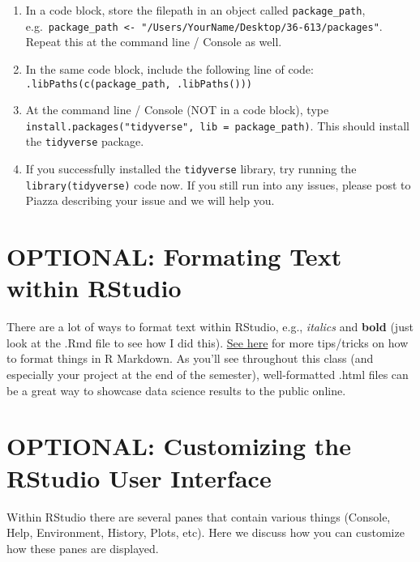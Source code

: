 \documentclass[
]{article}
\begin{document}
\begin{enumerate}
\def\labelenumi{\alph{enumi}.}
\setcounter{enumi}{1}
\item
  In a code block, store the filepath in an object called
  \texttt{package\_path},
  e.g.~\texttt{package\_path\ \textless{}-\ "/Users/YourName/Desktop/36-613/packages"}.
  Repeat this at the command line / Console as well.
\item
  In the same code block, include the following line of code:
  \texttt{.libPaths(c(package\_path,\ .libPaths()))}
\item
  At the command line / Console (NOT in a code block), type
  \texttt{install.packages("tidyverse",\ lib\ =\ package\_path)}. This
  should install the \texttt{tidyverse} package.
\item
  If you successfully installed the \texttt{tidyverse} library, try
  running the \texttt{library(tidyverse)} code now. If you still run
  into any issues, please post to Piazza describing your issue and we
  will help you.
\end{enumerate}

\hypertarget{optional-formating-text-within-rstudio}{%
\section{OPTIONAL: Formating Text within
RStudio}\label{optional-formating-text-within-rstudio}}

There are a lot of ways to format text within RStudio, e.g.,
\emph{italics} and \textbf{bold} (just look at the .Rmd file to see how
I did this).
\href{https://www.rstudio.com/wp-content/uploads/2015/02/rmarkdown-cheatsheet.pdf}{See
here} for more tips/tricks on how to format things in R Markdown. As
you'll see throughout this class (and especially your project at the end
of the semester), well-formatted .html files can be a great way to
showcase data science results to the public online.

\hypertarget{optional-customizing-the-rstudio-user-interface}{%
\section{OPTIONAL: Customizing the RStudio User
Interface}\label{optional-customizing-the-rstudio-user-interface}}

Within RStudio there are several panes that contain various things
(Console, Help, Environment, History, Plots, etc). Here we discuss how
you can customize how these panes are displayed.
\end{document}
